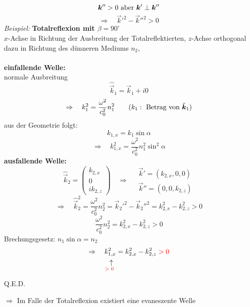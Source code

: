 \begin{equation*}
\bm{k}'' > 0 \ \textrm{aber} \ \bm{k}' \perp \bm{k}''
\end{equation*}
\begin{equation*}
\Rightarrow \quad \vec{k}'^2 - \vec{k}''^2 > 0
\end{equation*}
\emph{Beispiel:} \textbf{Totalreflexion mit $ \beta = 90 ^\circ $}\\
$ x $-Achse in Richtung der Ausbreitung der Totalreflektierten, $ z $-Achse orthogonal dazu in Richtung des dünneren Mediums $ n_2 $,\\
\\[5pt]
\textbf{einfallende Welle:}\\
normale Ausbreitung
\begin{equation*}
\hat{\vec{k}}_1 = \vec{k}_1 + i 0
\end{equation*}
\begin{equation*}
\Rightarrow \quad k_1^2 = \frac{\omega^2}{c_0^2} n_1^2 \qquad (k_1: \textrm{ Betrag von } \hat{\bm{k}}_1)
\end{equation*}
aus der Geometrie folgt:
\begin{equation*}
k_{1,x} = k_1 \sin\alpha
\end{equation*}
\begin{equation*}
\Rightarrow \quad k_{1,x}^2 = \frac{\omega^2}{c_0^2} n_1^2 \sin^2 \alpha
\end{equation*}
\textbf{ausfallende Welle:}
\begin{equation*}
\hat{\vec{k}}_2 = \begin{pmatrix}
k_{2,x} \\ 0 \\ i k_{2,z}
\end{pmatrix} \quad \Rightarrow \quad \begin{array}{c}
\vec{k}' = (k_{2,x} , 0 , 0) \\ \vec{k}'' = (0 , 0 , k_{2,z})
\end{array}
\end{equation*}
\begin{equation*}
\Rightarrow \quad \hat{\vec{k}}_2^2 = \frac{\omega^2}{c_0^2} n_2^2 = \vec{k}_2'^2 - \vec{k}_2''^2 = k_{2,x}^2 - k_{2,z}^2 > 0
\end{equation*}
\begin{equation*}
\frac{\omega^2}{c_0^2} n_2^2 = k_{2,x}^2 - k_{2,z}^2 > 0
\end{equation*}
Brechungsgesetz: $ n_1 \sin\alpha = n_2 $
\begin{equation*}
\Rightarrow \quad \custo{\leftarrow}{k_{1,x}^2}{\tx{\color{red} > 0 \color{black}}} = k_{2,x}^2 - k_{2,z}^2 \color{red} >0 \color{black}
\end{equation*}
\begin{flushright}
	\vspace{-20pt}
	\color{red} Q.E.D. \color{black}
\end{flushright}
$ \Rightarrow $ Im Falle der Totalreflexion existiert eine evaneszente Welle \mau

